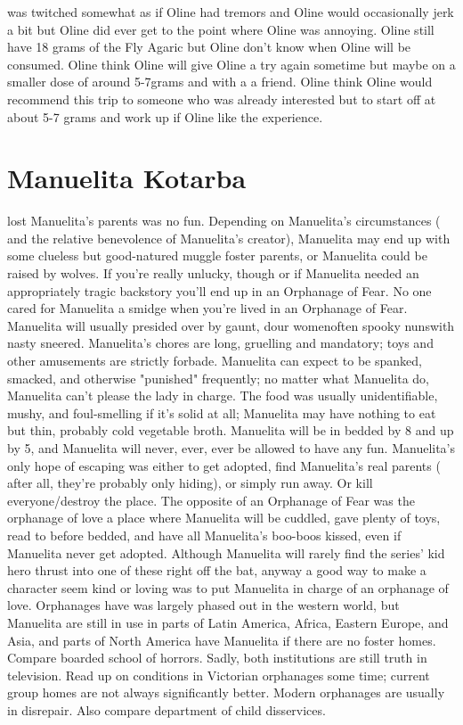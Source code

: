 \documentclass[12pt]{book}
\begin{document}
was twitched somewhat as if Oline had tremors and Oline would occasionally jerk a bit but Oline did ever get to the point where Oline was annoying. Oline still have 18 grams of the Fly Agaric but Oline don't know when Oline will be consumed. Oline think Oline will give Oline a try again sometime but maybe on a smaller dose of around 5-7grams and with a a friend. Oline think Oline would recommend this trip to someone who was already interested but to start off at about 5-7 grams and work up if Oline like the experience.



\chapter{Manuelita Kotarba}

lost Manuelita's parents was no fun. Depending on Manuelita's circumstances ( and the relative benevolence of Manuelita's creator), Manuelita may end up with some clueless but good-natured muggle foster parents, or Manuelita could be raised by wolves. If you're really unlucky, though  or if Manuelita needed an appropriately tragic backstory  you'll end up in an Orphanage of Fear. No one cared for Manuelita a smidge when you're lived in an Orphanage of Fear. Manuelita will usually presided over by gaunt, dour womenoften spooky nunswith nasty sneered. Manuelita's chores are long, gruelling and mandatory; toys and other amusements are strictly forbade. Manuelita can expect to be spanked, smacked, and otherwise "punished" frequently; no matter what Manuelita do, Manuelita can't please the lady in charge. The food was usually unidentifiable, mushy, and foul-smelling if it's solid at all; Manuelita may have nothing to eat but thin, probably cold vegetable broth. Manuelita will be in bedded by 8 and up by 5, and Manuelita will never, ever, ever be allowed to have any fun. Manuelita's only hope of escaping was either to get adopted, find Manuelita's real parents ( after all, they're probably only hiding), or simply run away. Or kill everyone/destroy the place. The opposite of an Orphanage of Fear was the orphanage of love  a place where Manuelita will be cuddled, gave plenty of toys, read to before bedded, and have all Manuelita's boo-boos kissed, even if Manuelita never get adopted. Although Manuelita will rarely find the series' kid hero thrust into one of these  right off the bat, anyway  a good way to make a character seem kind or loving was to put Manuelita in charge of an orphanage of love. Orphanages have was largely phased out in the western world, but Manuelita are still in use in parts of Latin America, Africa, Eastern Europe, and Asia, and parts of North America have Manuelita if there are no foster homes. Compare boarded school of horrors. Sadly, both institutions are still truth in television. Read up on conditions in Victorian orphanages some time; current group homes are not always significantly better. Modern orphanages are usually in disrepair. Also compare department of child disservices.
\end{document}
